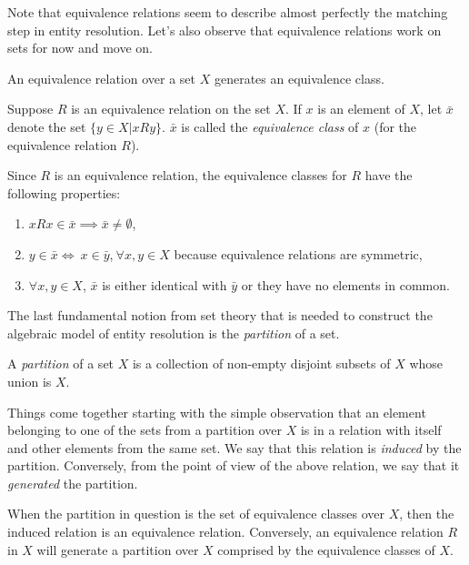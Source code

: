 \documentclass[journal]{IEEEtran}
\begin{document}
    Note that equivalence relations seem to describe almost perfectly the
    matching step in entity resolution.
    Let's also observe that equivalence relations work on sets for now and move
    on.

    An equivalence relation over a set $X$ generates an equivalence class.

    \begin{defn}Suppose $R$ is an equivalence relation on the set $X$.
    If $x$ is an element of $X$, let $\bar{x}$ denote the set
    $\{y \in X | xRy\}$.
    $\bar{x}$ is called the \textit{equivalence class} of $x$ (for the
    equivalence relation $R$)\cite{hoffman1971linear}.
    \end{defn}

    Since $R$ is an equivalence relation, the equivalence classes for $R$ have the
    following properties\cite{hoffman1971linear}:
    \begin{enumerate}
        \item $xRx \in \bar{x} \implies \bar{x} \neq \emptyset$,
        \item $y\in\bar{x}\iff~x\in\bar{y}$,$~\forall x,y \in X$ because
        equivalence relations are symmetric,
        \item $\forall x,y \in X$, $\bar{x}$ is either identical with $\bar{y}$
        or they have no elements in common\cite{hoffman1971linear,Tal11}.
    \end{enumerate}
    
    The last fundamental notion from set theory that is needed to construct the
    algebraic model of entity resolution is the \textit{partition} of a set.

    \begin{defn}
        A \textit{partition} of a set $X$ is a collection of non-empty disjoint
        subsets of $X$ whose union is $X$\cite{halmos1960naive,Tal11}.
    \end{defn}

    Things come together starting with the simple observation that an element
    belonging to one of the sets from a partition over $X$ is in a relation with
    itself and other elements from the same set.
    We say that this relation is \textit{induced} by the partition.
    Conversely, from the point of view of the above relation, we say that it
    \textit{generated} the partition.

    When the partition in question is the set of equivalence classes over $X$,
    then the induced relation is an equivalence relation.
    Conversely, an equivalence relation $R$ in $X$ will generate a partition
    over $X$ comprised by the equivalence classes of $X$\cite{halmos1960naive,
    Tal11}.
\end{document}
